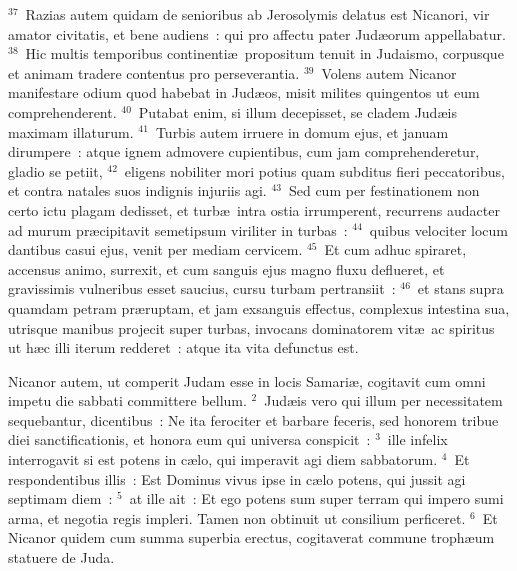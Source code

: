 ${}^{37}$~Razias autem quidam de senioribus ab Jerosolymis delatus est Nicanori, vir amator civitatis, et bene audiens~: qui pro affectu pater Jud\ae orum appellabatur.
${}^{38}$~Hic multis temporibus continenti\ae\ propositum tenuit in Judaismo, corpusque et animam tradere contentus pro perseverantia.
${}^{39}$~Volens autem Nicanor manifestare odium quod habebat in Jud\ae os, misit milites quingentos ut eum comprehenderent.
${}^{40}$~Putabat enim, si illum decepisset, se cladem Jud\ae is maximam illaturum.
${}^{41}$~Turbis autem irruere in domum ejus, et januam dirumpere~: atque ignem admovere cupientibus, cum jam comprehenderetur, gladio se petiit,
${}^{42}$~eligens nobiliter mori potius quam subditus fieri peccatoribus, et contra natales suos indignis injuriis agi.
${}^{43}$~Sed cum per festinationem non certo ictu plagam dedisset, et turb\ae\ intra ostia irrumperent, recurrens audacter ad murum pr\ae cipitavit semetipsum viriliter in turbas~:
${}^{44}$~quibus velociter locum dantibus casui ejus, venit per mediam cervicem.
${}^{45}$~Et cum adhuc spiraret, accensus animo, surrexit, et cum sanguis ejus magno fluxu deflueret, et gravissimis vulneribus esset saucius, cursu turbam pertransiit~:
${}^{46}$~et stans supra quamdam petram pr\ae ruptam, et jam exsanguis effectus, complexus intestina sua, utrisque manibus projecit super turbas, invocans dominatorem vit\ae\ ac spiritus ut h\ae c illi iterum redderet~: atque ita vita defunctus est.

\lettrine[lines=3,image=true,loversize=0.05,lraise=-0.03]{N}{}icanor autem, ut comperit Judam esse in locis Samari\ae , cogitavit cum omni impetu die sabbati committere bellum.
${}^{2}$~Jud\ae is vero qui illum per necessitatem sequebantur, dicentibus~: Ne ita ferociter et barbare feceris, sed honorem tribue diei sanctificationis, et honora eum qui universa conspicit~:
${}^{3}$~ille infelix interrogavit si est potens in c\ae lo, qui imperavit agi diem sabbatorum.
${}^{4}$~Et respondentibus illis~: Est Dominus vivus ipse in c\ae lo potens, qui jussit agi septimam diem~:
${}^{5}$~at ille ait~: Et ego potens sum super terram qui impero sumi arma, et negotia regis impleri. Tamen non obtinuit ut consilium perficeret.
${}^{6}$~Et Nicanor quidem cum summa superbia erectus, cogitaverat commune troph\ae um statuere de Juda.


